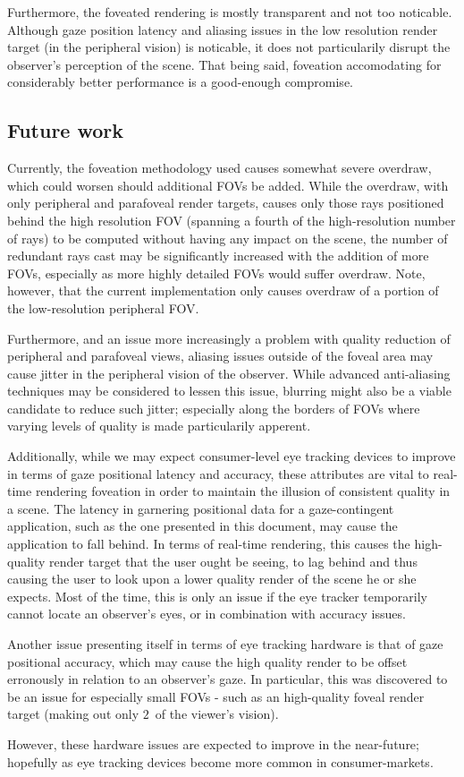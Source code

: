 Furthermore, the foveated rendering is mostly transparent and not too noticable.
Although gaze position latency and aliasing issues in the low resolution render target (in the peripheral vision) is noticable, it does not particularily disrupt the observer's perception of the scene.
That being said, foveation accomodating for considerably better performance is a good-enough compromise.

\subsection{Future work}
Currently, the foveation methodology used causes somewhat severe overdraw, which could worsen should additional FOVs be added.
While the overdraw, with only peripheral and parafoveal render targets, causes only those rays positioned behind the high resolution FOV (spanning a fourth of the high-resolution number of rays) to be computed without having any impact on the scene, the number of redundant rays cast may be significantly increased with the addition of more FOVs, especially as more highly detailed FOVs would suffer overdraw.
Note, however, that the current implementation only causes overdraw of a portion of the low-resolution peripheral FOV.

Furthermore, and an issue more increasingly a problem with quality reduction of peripheral and parafoveal views, aliasing issues outside of the foveal area may cause jitter in the peripheral vision of the observer.
While advanced anti-aliasing techniques may be considered to lessen this issue, blurring might also be a viable candidate to reduce such jitter; especially along the borders of FOVs where varying levels of quality is made particularily apperent.

Additionally, while we may expect consumer-level eye tracking devices to improve in terms of gaze positional latency and accuracy, these attributes are vital to real-time rendering foveation in order to maintain the illusion of consistent quality in a scene.
The latency in garnering positional data for a gaze-contingent application, such as the one presented in this document, may cause the application to fall behind.
In terms of real-time rendering, this causes the high-quality render target that the user ought be seeing, to lag behind and thus causing the user to look upon a lower quality render of the scene he or she expects.
Most of the time, this is only an issue if the eye tracker temporarily cannot locate an observer's eyes, or in combination with accuracy issues.

Another issue presenting itself in terms of eye tracking hardware is that of gaze positional accuracy, which may cause the high quality render to be offset erronously in relation to an observer's gaze.
In particular, this was discovered to be an issue for especially small FOVs - such as an high-quality foveal render target (making out only $2$\degree\ of the viewer's vision).

However, these hardware issues are expected to improve in the near-future; hopefully as eye tracking devices become more common in consumer-markets.
